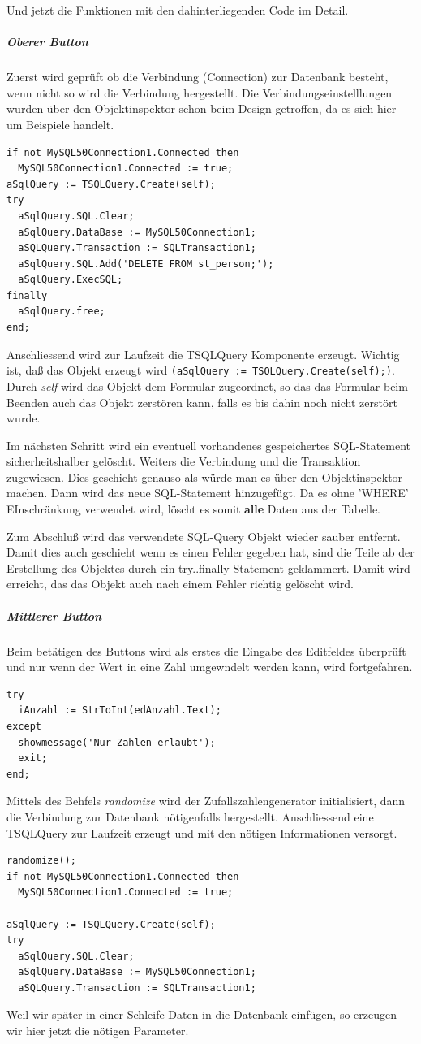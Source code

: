 Und jetzt die Funktionen mit den dahinterliegenden Code im Detail.
\subparagraph{Oberer Button}
Zuerst wird geprüft ob die Verbindung (Connection) zur Datenbank besteht, wenn nicht so wird die Verbindung hergestellt. Die Verbindungseinstelllungen wurden über den Objektinspektor schon beim Design getroffen, da es sich hier um Beispiele handelt.

\begin{verbatim}
if not MySQL50Connection1.Connected then
  MySQL50Connection1.Connected := true;
aSqlQuery := TSQLQuery.Create(self);
try
  aSqlQuery.SQL.Clear;
  aSqlQuery.DataBase := MySQL50Connection1;
  aSQLQuery.Transaction := SQLTransaction1;
  aSqlQuery.SQL.Add('DELETE FROM st_person;');
  aSqlQuery.ExecSQL;
finally
  aSqlQuery.free;
end;
\end{verbatim}

Anschliessend wird zur Laufzeit die TSQLQuery Komponente erzeugt. Wichtig ist, daß das Objekt erzeugt wird \verb|(aSqlQuery := TSQLQuery.Create(self);)|. Durch \emph{self} wird das Objekt dem Formular zugeordnet, so das das Formular beim Beenden auch das Objekt zerstören kann, falls es bis dahin noch nicht zerstört wurde.

Im nächsten Schritt wird ein eventuell vorhandenes gespeichertes SQL-Statement sicherheitshalber gelöscht. Weiters die Verbindung und die Transaktion zugewiesen. Dies geschieht genauso als würde man es über den Objektinspektor machen. Dann wird das neue SQL-Statement hinzugefügt. Da es ohne 'WHERE' EInschränkung verwendet wird, löscht es somit \textbf{alle} Daten aus der Tabelle. 

Zum Abschluß wird das verwendete SQL-Query Objekt wieder sauber entfernt. Damit dies auch geschieht wenn es einen Fehler gegeben hat, sind die Teile ab der Erstellung des Objektes durch ein try..finally Statement geklammert. Damit wird erreicht, das das Objekt auch nach einem Fehler richtig gelöscht wird.
\subparagraph{Mittlerer Button}
Beim betätigen des Buttons wird als erstes die Eingabe des Editfeldes überprüft und nur wenn der Wert in eine Zahl umgewndelt werden kann, wird fortgefahren.
\begin{verbatim}
try
  iAnzahl := StrToInt(edAnzahl.Text);
except
  showmessage('Nur Zahlen erlaubt');
  exit;
end;
\end{verbatim}

Mittels des Behfels \emph{randomize} wird der Zufallszahlengenerator initialisiert, dann die Verbindung zur Datenbank nötigenfalls hergestellt. Anschliessend eine TSQLQuery zur Laufzeit erzeugt und mit den nötigen Informationen versorgt.
\begin{verbatim}
randomize();
if not MySQL50Connection1.Connected then 
  MySQL50Connection1.Connected := true;
  
aSqlQuery := TSQLQuery.Create(self);
try
  aSqlQuery.SQL.Clear;
  aSqlQuery.DataBase := MySQL50Connection1;
  aSQLQuery.Transaction := SQLTransaction1;
\end{verbatim}
Weil wir später in einer Schleife Daten in die Datenbank einfügen, so erzeugen wir hier jetzt die nötigen Parameter. 

